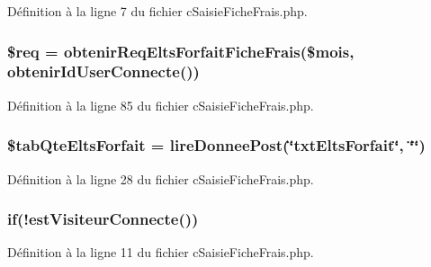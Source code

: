 Définition à la ligne 7 du fichier c\-Saisie\-Fiche\-Frais.\-php.

\hypertarget{c_saisie_fiche_frais_8php_a63a7a283ea5dee8af1e2d5a3435bf370}{
\subsubsection[{\$req}]{\setlength{\rightskip}{0pt plus 5cm}\$req = {\bf obtenir\-Req\-Elts\-Forfait\-Fiche\-Frais}(\$mois, {\bf obtenir\-Id\-User\-Connecte}())}}\label{c_saisie_fiche_frais_8php_a63a7a283ea5dee8af1e2d5a3435bf370}


Définition à la ligne 85 du fichier c\-Saisie\-Fiche\-Frais.\-php.

\hypertarget{c_saisie_fiche_frais_8php_a7bbd2a8422d6c9a9d2d236436508e417}{
\subsubsection[{\$tab\-Qte\-Elts\-Forfait}]{\setlength{\rightskip}{0pt plus 5cm}\$tab\-Qte\-Elts\-Forfait = {\bf lire\-Donnee\-Post}(\char`\"{}txt\-Elts\-Forfait\char`\"{}, \char`\"{}\char`\"{})}}\label{c_saisie_fiche_frais_8php_a7bbd2a8422d6c9a9d2d236436508e417}


Définition à la ligne 28 du fichier c\-Saisie\-Fiche\-Frais.\-php.

\hypertarget{c_saisie_fiche_frais_8php_a5b407bc19b08452156cf04e24ef10ed7}{
\subsubsection[{if}]{\setlength{\rightskip}{0pt plus 5cm}if(!{\bf est\-Visiteur\-Connecte}())}}\label{c_saisie_fiche_frais_8php_a5b407bc19b08452156cf04e24ef10ed7}


Définition à la ligne 11 du fichier c\-Saisie\-Fiche\-Frais.\-php.

